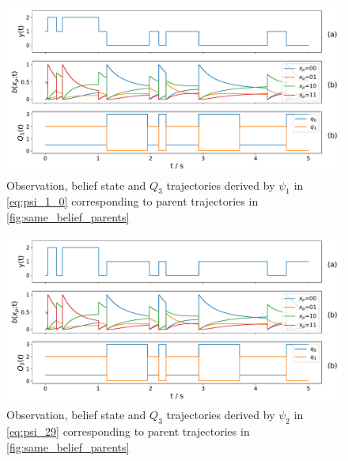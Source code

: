 \begin{figure}[H]
	\begin{center}
		\includegraphics[width=.90\textwidth]{figures/equivalence_classes/same_belief/psi_0}
		\caption{Observation, belief state and $ Q_3 $ trajectories derived by $ \psi_1 $ in \autoref{eq:psi_1_0} corresponding to parent trajectories in \autoref{fig:same_belief_parents}}
		\label{fig:same_belief_psi_0}
	\end{center}
\end{figure}
\begin{figure}[H]
	\begin{center}
		\includegraphics[width=.90\textwidth]{figures/equivalence_classes/same_belief/psi_29}
		\caption{Observation, belief state and $ Q_3 $ trajectories derived by $ \psi_2 $ in \autoref{eq:psi_29} corresponding to parent trajectories in \autoref{fig:same_belief_parents}}
		\label{fig:same_belief_psi_29}
	\end{center}
\end{figure}


